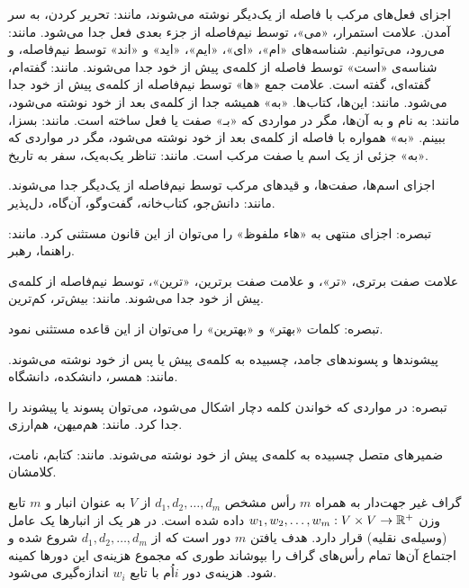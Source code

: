 
اجزای فعل‌های مرکب با فاصله از یک‌دیگر نوشته می‌شوند، مانند: تحریر کردن، به سر آمدن.
علامت استمرار، «می»، توسط نیم‌فاصله از جزء‌ بعدی فعل جدا می‌شود. مانند: می‌رود، می‌توانیم.
شناسه‌های «ام»، «ای»، «ایم»، «اید» و «اند» توسط نیم‌فاصله، و شناسه‌ی «است» توسط فاصله از کلمه‌ی پیش از خود جدا می‌شوند. مانند: گفته‌ام، گفته‌ای، گفته است.
علامت جمع «ها» توسط نیم‌فاصله از کلمه‌ی پیش از خود جدا می‌شود. مانند: این‌ها، کتاب‌ها.
«به» همیشه جدا از کلمه‌ی بعد از خود نوشته می‌شود، مانند: به‌ نام و به آن‌ها، مگر در مواردی که «بـ» صفت یا فعل ساخته است. مانند: بسزا، ببینم.
«به» همواره با فاصله از کلمه‌ی بعد از خود نوشته می‌شود، مگر در مواردی که «به» جزئی از یک اسم یا صفت مرکب است. مانند: تناظر یک‌به‌یک، سفر به تاریخ. 




اجزای اسم‌ها، صفت‌ها، و قیدهای مرکب توسط نیم‌فاصله از یک‌دیگر جدا می‌شوند. مانند: دانش‌جو، کتاب‌خانه، گفت‌وگو، آن‌گاه، دل‌پذیر.

        تبصره: اجزای منتهی به «هاء ملفوظ» را می‌توان از این قانون مستثنی کرد. مانند: راهنما، رهبر. 

علامت صفت برتری، «تر»، و علامت صفت برترین، «ترین»، توسط نیم‌فاصله از کلمه‌ی پیش از خود جدا می‌شوند. مانند: بیش‌تر، کم‌ترین.

        تبصره‌: کلمات «بهتر» و «بهترین» را می‌توان از این قاعده مستثنی نمود. 

پیشوندها و پسوندهای جامد، چسبیده به کلمه‌ی پیش یا پس از خود نوشته می‌شوند. مانند: همسر، دانشکده، دانشگاه.

        تبصره‌: در مواردی که خواندن کلمه دچار اشکال می‌شود، می‌توان پسوند یا پیشوند را جدا کرد. مانند: هم‌میهن، هم‌ارزی. 

ضمیرهای متصل چسبیده به کلمه‌ی پیش‌ از خود نوشته می‌شوند. مانند: کتابم، نامت، کلامشان. 



 گراف غیر جهت‌دار   به همراه $m$ رأس مشخص $d_1, d_2, \ldots, d_m$ از $V$ به عنوان انبار و $m$ تابع وزن $w_1, w_2, \ldots,  w_m: V \times V \rightarrow \mathbb{R}^+$ داده شده است. در هر یک از انبارها یک عامل (وسیله‌ی نقلیه) قرار دارد. هدف یافتن $m$ دور است که از $d_1, d_2, \ldots,  d_m$ شروع شده و اجتماع آن‌ها تمام رأس‌های گراف را بپوشاند طوری که مجموع هزینه‌ی این دورها کمینه شود.
 هزینه‌ی دور $i$اُم با تابع $w_i$ اندازه‌گیری می‌شود.
 
